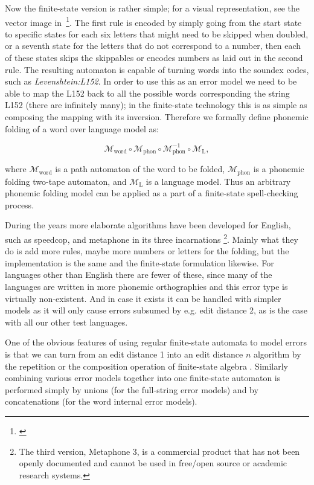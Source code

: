 \documentclass[a4paper,12pt]{article}
\begin{document}
Now the finite-state version is rather simple; for a visual representation, 
see the vector image in~\footnote{\url{}}. The first rule is encoded by
simply going from the start state to specific states for each six letters that
might need to be skipped when doubled, or a seventh state for the letters that
do not correspond to a number, then each of these states skips the skippables
or encodes numbers as laid out in the second rule. The resulting automaton is
capable of turning words into the soundex codes, such as
\emph{Levenshtein:L152}. In order to use this as an error model we need to be
able to map the L152 back to all the possible words corresponding the string
L152 (there are infinitely many); in the finite-state technology this is as
simple as composing the mapping with its inversion. Therefore we formally
define phonemic folding of a word over language model as:

\begin{equation}
    \mathcal{M}_{\mathrm{word}} \circ \mathcal{M}_{\mathrm{phon}} \circ \mathcal{M}_{\mathrm{phon}}^{-1} \circ \mathcal{M}_{\mathrm{L}},
\end{equation}

where $\mathcal{M}_{\mathrm{word}}$ is a path automaton of the word to be
folded, $\mathcal{M}_{\mathrm{phon}}$ is a phonemic folding two-tape automaton,
and $\mathcal{M}_{\mathrm{L}}$ is a language model. Thus an arbitrary phonemic
folding model can be applied as a part of a finite-state spell-checking
process.

During the years more elaborate algorithms have been developed for English,
such as speedcop, and metaphone in its three incarnations
\cite[]{philips1990hanging,philips2000double}\footnote{The third version,
    Metaphone 3, is a commercial product that has not been openly documented
and cannot be used in free/open source or academic research systems.}.  Mainly
what they do is add more rules, maybe more numbers or letters for the folding,
but the implementation is the same and the finite-state formulation likewise.
For languages other than English there are fewer of these, since many of the
languages are written in more phonemic orthographies and this error type is
virtually non-existent. And in case it exists it can be handled with simpler
models as it will only cause errors subsumed by e.g. edit distance 2, as is the
case with all our other test languages.

One of the obvious features of using regular finite-state automata to model
errors is that we can turn from an edit distance 1 into an edit distance $n$
algorithm by the repetition or the composition operation of finite-state
algebra \cite[]{pirinen2012effects}.  Similarly combining various error models
together into one finite-state automaton is performed simply by unions (for the
full-string error models) and by concatenations (for the word internal error
models).
\end{document}
